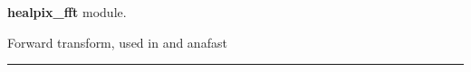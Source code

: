 \begin{modules}
  \begin{sulist}{} %
  \item[\textbf{healpix\_fft}] module.
  \end{sulist}
\end{modules}

\begin{related}
  \begin{sulist}{} %
  \item[\htmlref{ring\_analysis}{sub:ring_analysis}] Forward transform, used in
   and anafast 
  \end{sulist}
\end{related}

\rule{\hsize}{2mm}

\newpage
